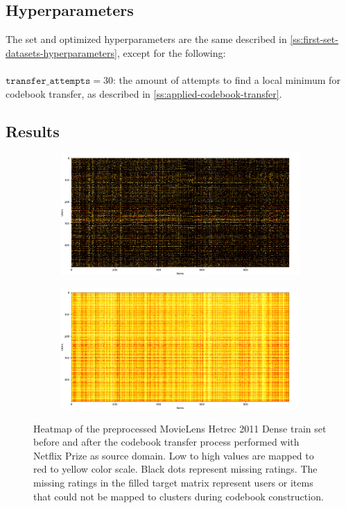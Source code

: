 \subsection{Hyperparameters}

The set and optimized hyperparameters are the same described in \autoref{ss:first-set-datasets-hyperparameters}, except for the following:\\\\
$\texttt{transfer\_attempts} = 30$: the amount of attempts to find a local minimum for codebook transfer, as described in \autoref{ss:applied-codebook-transfer}.

\clearpage


\subsection{Results}

\begin{figure}[hbt!]
\centering
\begin{subfigure}{\textwidth}
\includegraphics[width=\textwidth]{pictures/movielens-target}
\end{subfigure}
\begin{subfigure}{\textwidth}
\includegraphics[width=\textwidth]{pictures/movielens-target-filled}
\end{subfigure}
\caption{Heatmap of the preprocessed MovieLens Hetrec 2011 Dense train set before and after the codebook transfer process performed with Netflix Prize as source domain. Low to high values are mapped to red to yellow color scale. Black dots represent missing ratings. The missing ratings in the filled target matrix represent users or items that could not be mapped to clusters during codebook construction.}
\end{figure}

